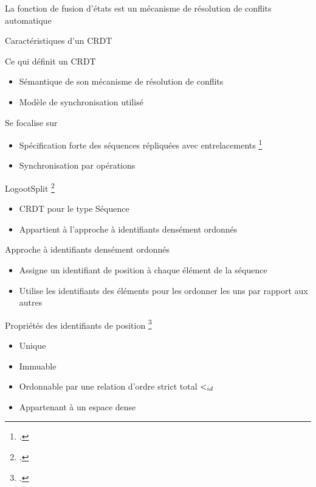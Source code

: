 \begin{frame}[standout]
    La fonction de fusion d'états est un mécanisme de résolution de conflits automatique
\end{frame}

\begin{frame}{Caractéristiques d'un CRDT}
    \begin{block}{Ce qui définit un CRDT}
        \begin{itemize}
            \item Sémantique de son mécanisme de résolution de conflits
            \item Modèle de synchronisation utilisé
        \end{itemize}
    \end{block}
    \begin{block}{Se focalise sur}
        \begin{itemize}
            \item Spécification forte des séquences répliquées avec entrelacements \footcite{2021-specification-complexity-collaborative-text-editing-attiya}
            \item Synchronisation par opérations
        \end{itemize}
    \end{block}
\end{frame}

\begin{frame}{LogootSplit \footcite{2013-logootsplit}}
    \begin{itemize}
        \item CRDT pour le type Séquence
        \item Appartient à l'approche à identifiants densément ordonnés
    \end{itemize}
\end{frame}

\begin{frame}{Approche à identifiants densément ordonnés}
    \begin{itemize}
        \item Assigne un identifiant de position à chaque élément de la séquence
        \item Utilise les identifiants des éléments pour les ordonner les uns par rapport aux autres
    \end{itemize}
    \begin{block}{Propriétés des identifiants de position \footcite{2009-treedoc-preguica}}
        \begin{itemize}
            \item Unique
            \item Immuable
            \item Ordonnable par une relation d'ordre strict total $<_{id}$
            \item Appartenant à un espace dense
        \end{itemize}
    \end{block}
\end{frame}

